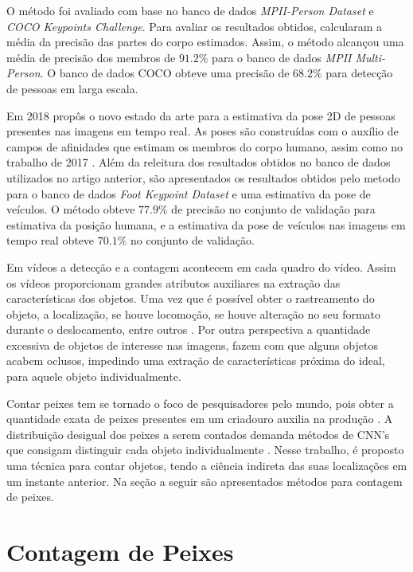 O método foi avaliado com base no banco de dados \textit{MPII-Person Dataset} e \textit{COCO Keypoints Challenge}. Para avaliar os resultados obtidos, \cite{Cao2017} calcularam a média da precisão das partes do corpo estimados. Assim, o método alcançou uma média de precisão dos membros de $91.2\%$ para o banco de dados \textit{MPII Multi-Person}. O banco de dados COCO obteve uma precisão de $68.2\%$ para detecção de pessoas em larga escala.

Em 2018 \cite{Cao2018} propôs o novo estado da arte para a estimativa da pose 2D de pessoas presentes nas imagens em tempo real. As poses são construídas com o auxílio de campos de afinidades que estimam os membros do corpo humano, assim como no trabalho de 2017 \cite{Cao2017}. Além da releitura dos resultados obtidos no banco de dados utilizados no artigo anterior, são apresentados os resultados obtidos pelo metodo para o banco de dados \textit{Foot Keypoint Dataset} e uma estimativa da pose de veículos. O método obteve $77.9\%$ de precisão no conjunto de validação para estimativa da posição humana, e a estimativa da pose de veículos nas imagens em tempo real obteve $70.1\%$ no conjunto de validação.


Em vídeos a detecção e a contagem acontecem em cada quadro do vídeo. Assim os vídeos proporcionam grandes atributos auxiliares na  extração das características dos objetos. Uma vez que é possível obter o rastreamento do objeto, a localização, se houve locomoção, se houve alteração no seu formato durante o deslocamento, entre outros . Por outra perspectiva a quantidade excessiva de objetos de interesse nas imagens, fazem com que alguns objetos acabem oclusos, impedindo uma extração de características próxima do ideal, para aquele objeto individualmente.


Contar peixes tem se tornado o foco de pesquisadores pelo mundo, pois obter a quantidade exata de peixes presentes em um criadouro auxilia na produção \cite{FAO}. A distribuição desigual dos peixes a serem contados demanda métodos de CNN's que consigam distinguir cada objeto individualmente \cite{article, Simonyan14c, inproceedings, 8451787}.
Nesse trabalho, é proposto uma técnica para contar objetos, tendo a ciência indireta das suas localizações em um instante anterior.
Na seção a seguir são apresentados métodos para contagem de peixes.

\section{Contagem de Peixes}


























